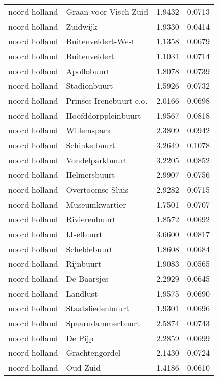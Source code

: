 \begin{longtable}{llcc}
noord holland & Graan voor Visch-Zuid & 1.9432 & 0.0713 \\
noord holland & Zuidwijk & 1.9330 & 0.0414 \\
noord holland & Buitenveldert-West & 1.1358 & 0.0679 \\
noord holland & Buitenveldert & 1.1031 & 0.0714 \\
noord holland & Apollobuurt & 1.8078 & 0.0739 \\
noord holland & Stadionbuurt & 1.5926 & 0.0732 \\
noord holland & Prinses Irenebuurt e.o. & 2.0166 & 0.0698 \\
noord holland & Hoofddorppleinbuurt & 1.9567 & 0.0818 \\
noord holland & Willemspark & 2.3809 & 0.0942 \\
noord holland & Schinkelbuurt & 3.2649 & 0.1078 \\
noord holland & Vondelparkbuurt & 3.2205 & 0.0852 \\
noord holland & Helmersbuurt & 2.9907 & 0.0756 \\
noord holland & Overtoomse Sluis & 2.9282 & 0.0715 \\
noord holland & Museumkwartier & 1.7501 & 0.0707 \\
noord holland & Rivierenbuurt & 1.8572 & 0.0692 \\
noord holland & IJselbuurt & 3.6600 & 0.0817 \\
noord holland & Scheldebuurt & 1.8608 & 0.0684 \\
noord holland & Rijnbuurt & 1.9083 & 0.0565 \\
noord holland & De Baarsjes & 2.2929 & 0.0645 \\
noord holland & Landlust & 1.9575 & 0.0690 \\
noord holland & Staatsliedenbuurt & 1.9301 & 0.0696 \\
noord holland & Spaarndammerbuurt & 2.5874 & 0.0743 \\
noord holland & De Pijp & 2.2859 & 0.0699 \\
noord holland & Grachtengordel & 2.1430 & 0.0724 \\
noord holland & Oud-Zuid & 1.4186 & 0.0610 \\
\hline
\end{longtable}
